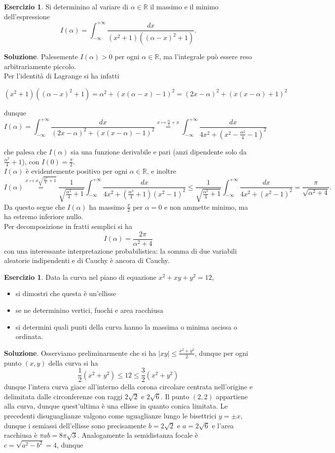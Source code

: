 \documentclass[a4paper,twoside]{article}
\newcommand{\R}{\mathbb{R}}
\theoremstyle{definition}
\newtheorem{ex}[theorem]{Esercizio}
\numberwithin{theorem}{section}
\begin{document}
\begin{ex} Si determinino al variare di $\alpha\in\R$ il massimo e il minimo dell'espressione 
$$ I(\alpha) = \int_{-\infty}^{+\infty}\frac{dx}{(x^2+1)((\alpha-x)^2+1)}.$$ 
\end{ex}
\textbf{Soluzione}. Palesemente $I(\alpha)>0$ per ogni $\alpha\in\R$, ma l'integrale può essere reso arbitrariamente piccolo.\\ Per l'identità di Lagrange si ha infatti 


$$(x^2+1)((\alpha-x)^2+1) = \alpha^2 + (x(\alpha-x)-1)^2 = (2x-\alpha)^2+(x(x-\alpha)+1)^2$$

dunque
$$ I(\alpha) = \int_{-\infty}^{+\infty}\frac{dx}{(2x-\alpha)^2+\left(x(x-\alpha)-1\right)^2} \stackrel{x\mapsto\frac{\alpha}{2}+x}{=} \int_{-\infty}^{+\infty}\frac{dx}{4x^2+\left(x^2-\frac{\alpha^2}{4}-1\right)^2}$$

che palesa che $I(\alpha)$ sia una funzione derivabile e pari (anzi dipendente solo da $\frac{\alpha^2}{4}+1$), con $I(0)=\frac{\pi}{2}$.\\ $I(\alpha)$ è evidentemente positivo per ogni $\alpha\in\R$, e inoltre 
$$ I(\alpha)\stackrel{x\mapsto x\sqrt{\frac{\alpha^2}{4}+1}}{=} \frac{1}{\sqrt{\frac{\alpha^2}{4}+1}}\int_{-\infty}^{+\infty}\frac{dx}{4x^2 + \left(\frac{\alpha^2}{4}+1\right)(x^2-1)^2}\leq \frac{1}{\sqrt{\frac{\alpha^2}{4}+1}}\int_{-\infty}^{+\infty}\frac{dx}{4x^2 + (x^2-1)^2}=\frac{\pi}{\sqrt{\alpha^2+4}}.$$
Da questo segue che $I(\alpha)$ ha massimo $\frac{\pi}{2}$ per $\alpha=0$ e non ammette minimo, ma ha estremo inferiore nullo.\\
Per decomposizione in fratti semplici si ha 
$$ I(\alpha) = \frac{2\pi}{\alpha^2+4} $$
con una interessante interpretazione probabilistica: la somma di due variabili aleatorie indipendenti e di Cauchy è ancora di Cauchy.

\begin{ex} Data la curva nel piano di equazione $x^2+xy+y^2=12$,
\begin{itemize}
 \item si dimostri che questa è un'ellisse
 \item se ne determinino vertici, fuochi e area racchiusa
 \item si determini quali punti della curva hanno la massima o minima ascissa o ordinata.
\end{itemize}
\end{ex}

\textbf{Soluzione}. Osserviamo preliminarmente che si ha $|xy|\leq\frac{x^2+y^2}{2}$, dunque per ogni punto $(x,y)$ della curva si ha 
$$ \frac{1}{2}(x^2+y^2) \leq 12 \leq \frac{3}{2}(x^2+y^2) $$
dunque l'intera curva giace all'interno della corona circolare centrata nell'origine e delimitata dalle circonferenze con raggi $2\sqrt{2}$ e $2\sqrt{6}$. Il punto $(2,2)$ appartiene alla curva, dunque quest'ultima è una ellisse in quanto conica limitata. Le precedenti disuguaglianze valgono come uguaglianze lungo le bisettrici $y=\pm x$, dunque i semiassi dell'ellisse sono precisamente $b=2\sqrt{2}$ e $a=2\sqrt{6}$ e l'area racchiusa è $\pi a b=8\pi\sqrt{3}$. Analogamente la semidistanza focale è $c=\sqrt{a^2-b^2}=4$, dunque \\
\end{document}
